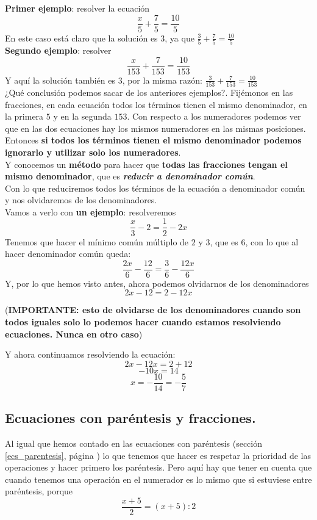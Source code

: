 \documentclass[a4paper,11pt,answers]{exam}
\begin{document}
  \textbf{Primer ejemplo}: resolver la ecuación
  \[\frac{x}{5} + \frac{7}{5} = \frac{10}{5}\]
  En este caso está claro que la solución es $3$, ya que $\frac{3}{5} + \frac{7}{5} = \frac{10}{5}$\\

  \textbf{Segundo ejemplo}: resolver
  \[\frac{x}{153} + \frac{7}{153} = \frac{10}{153}\]
  Y aquí la solución también es $3$, por la misma razón: $\frac{3}{153} + \frac{7}{153} =
  \frac{10}{153}$\\

  ¿Qué conclusión podemos sacar de los anteriores ejemplos?. Fijémonos en las fracciones, en cada ecuación todos los términos tienen el mismo denominador, en la primera $5$ y en la segunda $153$. Con respecto a los numeradores podemos ver que en las dos ecuaciones hay los mismos numeradores en las mismas posiciones.\\
  Entonces \textbf{si todos los términos tienen el mismo denominador podemos ignorarlo y utilizar solo los numeradores}.\\

  Y conocemos un \textbf{método} para hacer que \textbf{todas las fracciones tengan el mismo denominador}, que es \textbf{\emph{reducir a denominador común}}.\\
  Con lo que reduciremos todos los términos de la ecuación a denominador común y nos olvidaremos de los denominadores.\\

  Vamos a verlo con \textbf{un ejemplo}: resolveremos
  \[\frac{x}{3} - 2 = \frac{1}{2} - 2x\]
  Tenemos que hacer el mínimo común múltiplo de $2$ y $3$, que es $6$, con lo que al hacer denominador común queda:
  \[\frac{2x}{6} - \frac{12}{6} = \frac{3}{6} - \frac{12x}{6}\]
  Y, por lo que hemos visto antes, ahora podemos olvidarnos de los denominadores 
  \[2x - 12 = 2 - 12x\]
  \begin{center}\small (\textbf{IMPORTANTE: esto de olvidarse de los denominadores cuando son todos iguales solo lo podemos hacer cuando estamos resolviendo ecuaciones. Nunca en otro caso})\end{center}
  Y ahora continuamos resolviendo la ecuación:
  \[2x - 12x = 2 + 12\]
  \[-10x = 14\]
  \[x = -\frac{10}{14} = -\frac{5}{7}\]

  \subsection{Ecuaciones con paréntesis y fracciones.} \label{ecs_par_frac}
  Al igual que hemos contado en las ecuaciones con paréntesis (sección \ref{ecs_parentesis}, página \pageref{ecs_parentesis}) lo que tenemos que hacer es respetar la prioridad de las operaciones y hacer primero los paréntesis. Pero aquí hay que tener en cuenta que cuando tenemos una operación en el numerador es lo mismo que si estuviese entre paréntesis, porque
  \[\frac{x + 5}{2} = (x + 5):2\]
\end{document}
